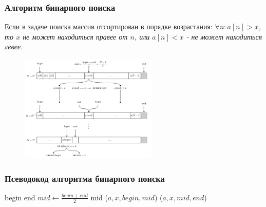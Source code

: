 \documentclass{beamer}
\begin{document}
    \begin{frame}
        \frametitle{Алгоритм бинарного поиска}
        \justifying
        Если в задаче поиска массив отсортирован в порядке возрастания:
        {\it $\forall n: a[n] > x$, то $x$ не может находиться правее от $n$, или $a[n] < x$ - не может находиться левее.}
        \begin{figure}[!tbp]
           \centering
           \includegraphics[width=0.58\textwidth]{pics/bsearch.png}
           \captionsetup{justification=centering}
       \end{figure}
    \end{frame}
    \begin{frame}
        \frametitle{Псеводокод алгоритма бинарного поиска}
        \begin{algorithm}[H]
            \DontPrintSemicolon
            {
                {
                    {
                        \KwRet begin\;
                    }
                    {
                        \KwRet end\;
                    }
                }
                $mid \leftarrow \frac{begin + end}{2}$\;
                {
                    \KwRet mid\;
                }
                {
                    \KwRet \FSearch($a, x, begin, mid$)\;
                }
                \Else
                {
                    \KwRet \FSearch($a, x, mid, end$)\;
                }
            }
        \end{algorithm}
    \end{frame}
\end{document}
